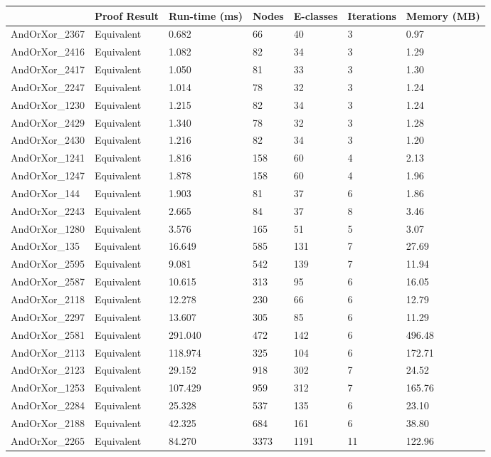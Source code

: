 \begin{tabular}{lllllll}
\toprule
 & Proof Result & Run-time (ms) & Nodes & E-classes & Iterations & Memory (MB) \\
\midrule
AndOrXor\_2367 & Equivalent & 0.682 & 66 & 40 & 3 & 0.97 \\
AndOrXor\_2416 & Equivalent & 1.082 & 82 & 34 & 3 & 1.29 \\
AndOrXor\_2417 & Equivalent & 1.050 & 81 & 33 & 3 & 1.30 \\
AndOrXor\_2247 & Equivalent & 1.014 & 78 & 32 & 3 & 1.24 \\
AndOrXor\_1230 & Equivalent & 1.215 & 82 & 34 & 3 & 1.24 \\
AndOrXor\_2429 & Equivalent & 1.340 & 78 & 32 & 3 & 1.28 \\
AndOrXor\_2430 & Equivalent & 1.216 & 82 & 34 & 3 & 1.20 \\
AndOrXor\_1241 & Equivalent & 1.816 & 158 & 60 & 4 & 2.13 \\
AndOrXor\_1247 & Equivalent & 1.878 & 158 & 60 & 4 & 1.96 \\
AndOrXor\_144 & Equivalent & 1.903 & 81 & 37 & 6 & 1.86 \\
AndOrXor\_2243 & Equivalent & 2.665 & 84 & 37 & 8 & 3.46 \\
AndOrXor\_1280 & Equivalent & 3.576 & 165 & 51 & 5 & 3.07 \\
AndOrXor\_135 & Equivalent & 16.649 & 585 & 131 & 7 & 27.69 \\
AndOrXor\_2595 & Equivalent & 9.081 & 542 & 139 & 7 & 11.94 \\
AndOrXor\_2587 & Equivalent & 10.615 & 313 & 95 & 6 & 16.05 \\
AndOrXor\_2118 & Equivalent & 12.278 & 230 & 66 & 6 & 12.79 \\
AndOrXor\_2297 & Equivalent & 13.607 & 305 & 85 & 6 & 11.29 \\
AndOrXor\_2581 & Equivalent & 291.040 & 472 & 142 & 6 & 496.48 \\
AndOrXor\_2113 & Equivalent & 118.974 & 325 & 104 & 6 & 172.71 \\
AndOrXor\_2123 & Equivalent & 29.152 & 918 & 302 & 7 & 24.52 \\
AndOrXor\_1253 & Equivalent & 107.429 & 959 & 312 & 7 & 165.76 \\
AndOrXor\_2284 & Equivalent & 25.328 & 537 & 135 & 6 & 23.10 \\
AndOrXor\_2188 & Equivalent & 42.325 & 684 & 161 & 6 & 38.80 \\
AndOrXor\_2265 & Equivalent & 84.270 & 3373 & 1191 & 11 & 122.96 \\

\end{tabular}
